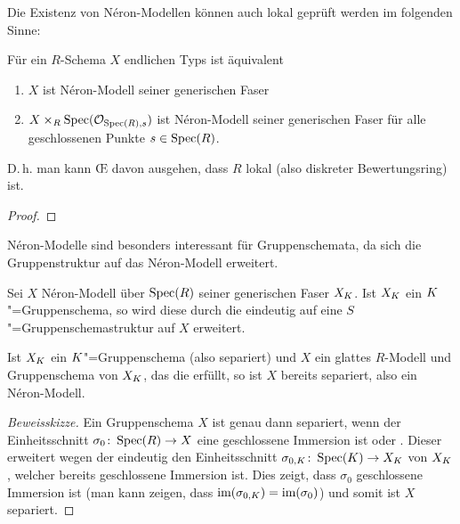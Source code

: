 \documentclass[german]{scrreprt}
\begin{document}
Die Existenz von Néron-Modellen können auch lokal geprüft werden im
folgenden Sinne:
\begin{Satz}\label{thm:neronmodelllokal}
  Für ein $R$-Schema $X$ endlichen Typs ist äquivalent
  \begin{enumerate}[label=(\roman*)]
  \item $X$ ist Néron-Modell seiner generischen Faser
  \item $X\times_R\operatorname{Spec}(\mathcal{O}_{\operatorname{Spec}(R),s})$ ist Néron-Modell seiner generischen
    Faser für alle geschlossenen Punkte $s\in\operatorname{Spec}(R)$.
  \end{enumerate}
  D.\,h. man kann \OE{} davon ausgehen, dass $R$ lokal (also diskreter
  Bewertungsring) ist.
  \cite[1.2, Proposition 3]{neron}
  \begin{proof}
  \end{proof}
\end{Satz}


Néron-Modelle sind besonders interessant für Gruppenschemata, da sich
die Gruppenstruktur auf das Néron-Modell erweitert.

\begin{Bemerkung}\label{thm:gruppenschemaerweiterung}
  Sei $X$ Néron-Modell über $\operatorname{Spec}(R)$ seiner generischen Faser
  $X_{K}$. Ist $X_{K}$ ein $K$"=Gruppenschema, so wird diese durch die
  \NAbbEig eindeutig auf eine
  $S$"=Gruppenschemastruktur auf $X$ erweitert.
  \cite[1.2, Proposition 6]{neron}
\end{Bemerkung}

\begin{Bemerkung}\label{nerongruppenschemaglatt}
  Ist $X_{K}$ ein $K$"=Gruppenschema (also separiert) und $X$ ein
  glattes $R$-Modell und Gruppenschema von $X_{K}$, das die
  \NAbbEig erfüllt, so ist $X$ bereits separiert,
  also ein Néron-Modell.
  \cite[1.2, Remark 7]{neron} 
  \begin{proof}[Beweisskizze]
    Ein Gruppenschema $X$ ist genau dann separiert, wenn der
    Einheitsschnitt $\sigma_0\colon\operatorname{Spec}(R)\to X$ eine geschlossene
    Immersion ist
    \cite[Lemma 38.6.1]{stacksproject} oder \cite[7.1, Lemma 2]{neron}.
    Dieser erweitert wegen der \NAbbEig eindeutig
    den Einheitsschnitt $\sigma_{0,K}\colon\operatorname{Spec}(K)\to X_{K}$ von
    $X_{K}$, welcher bereits geschlossene Immersion ist.
    Dies zeigt, dass $\sigma_0$ geschlossene Immersion ist
    (man kann zeigen, dass $\text{im}(\sigma_{0,K})=\text{im}(\sigma_0)$) und
    somit ist $X$ separiert. 
  \end{proof}
\end{Bemerkung}
\end{document}

